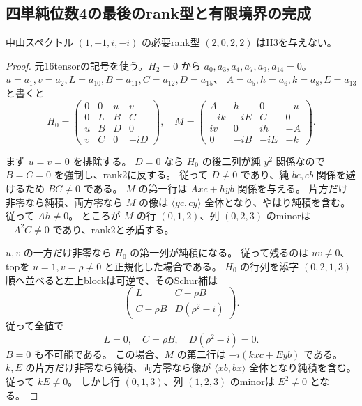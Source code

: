 \subsection{四単純位数4の最後のrank型と有限境界の完成}
\label{subsec:cubic-four-simple-order4-rankB}
\begin{theorem}
\label{thm:cubic-four-simple-order4-rankB-empty}
中山スペクトル $(1,-1,i,-i)$ の必要rank型 $(2,0,2,2)$ はH3を与えない。
\end{theorem}
\begin{proof}
元16tensorの記号を使う。$H_2=0$ から
$a_0,a_3,a_4,a_7,a_9,a_{14}=0$。
$u=a_1,v=a_2,L=a_{10},B=a_{11},C=a_{12},D=a_{15}$、
$A=a_5,h=a_6,k=a_8,E=a_{13}$ と書くと
\[
 H_0=\begin{pmatrix}
 0&0&u&v\\0&L&B&C\\u&B&D&0\\v&C&0&-iD
 \end{pmatrix},\quad
 M=\begin{pmatrix}
 A&h&0&-u\\-ik&-iE&C&0\\iv&0&ih&-A\\0&-iB&-iE&-k
 \end{pmatrix}.
\]

まず $u=v=0$ を排除する。
$D=0$ なら $H_0$ の後二列が純 $y^2$ 関係なので $B=C=0$ を強制し、rank2に反する。
従って $D\ne0$ であり、純 $bc,cb$ 関係を避けるため $BC\ne0$ である。
$M$ の第一行は $Axc+hyb$ 関係を与える。
片方だけ非零なら純積、両方零なら $M$ の像は $\langle yc,cy\rangle$ 全体となり、やはり純積を含む。
従って $Ah\ne0$。
ところが $M$ の行 $(0,1,2)$、列 $(0,2,3)$ のminorは $-A^2C\ne0$ であり、rank2と矛盾する。

$u,v$ の一方だけ非零なら $H_0$ の第一列が純積になる。
従って残るのは $uv\ne0$、topを $u=1,v=\rho\ne0$ と正規化した場合である。
$H_0$ の行列を添字 $(0,2,1,3)$ 順へ並べると左上blockは可逆で、そのSchur補は
\[
 \begin{pmatrix}
 L&C-\rho B\\C-\rho B&D(\rho^2-i)
 \end{pmatrix}.
\]
従って全値で
\[
 L=0,\quad C=\rho B,\quad D(\rho^2-i)=0.
\]
$B=0$ も不可能である。
この場合、$M$ の第二行は $-i(kxc+Eyb)$ である。
$k,E$ の片方だけ非零なら純積、両方零なら像が $\langle xb,bx\rangle$ 全体となり純積を含む。
従って $kE\ne0$。
しかし行 $(0,1,3)$、列 $(1,2,3)$ のminorは $E^2\ne0$ となる。


\end{proof}
